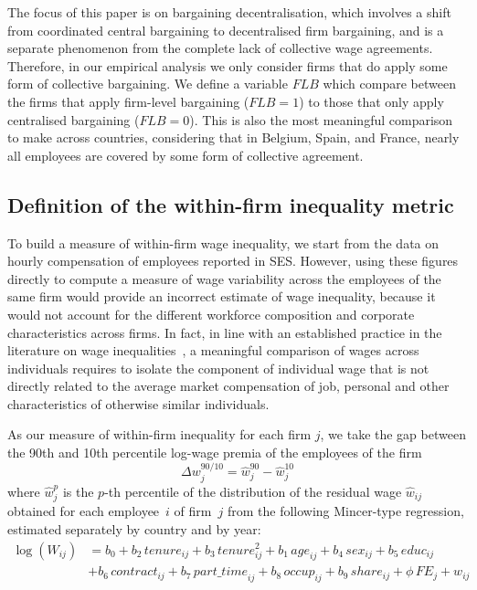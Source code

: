 \documentclass[12pt]{article}
\begin{document}
The focus of this paper is on bargaining decentralisation, which involves a shift from coordinated central bargaining to decentralised firm bargaining, and is a separate phenomenon from the complete lack of collective wage agreements. Therefore, in our empirical analysis we only consider firms that do apply some form of collective bargaining. We define a variable $\mathit{FLB}$ which compare between the firms that apply firm-level bargaining ($\mathit{FLB}=1$) to those that only apply centralised bargaining ($\mathit{FLB}=0$).
This is also the most meaningful comparison to make across countries, considering that in Belgium, Spain, and France, nearly all employees are covered by some form of collective agreement.


\subsection{Definition of the within-firm inequality metric}
To build a measure of within-firm wage inequality, we start from the data on hourly compensation of employees reported in SES. However, using these figures directly to compute a measure of wage variability across the employees of the same firm would provide an incorrect estimate of wage inequality, because it would not account for the different workforce composition and corporate characteristics across firms. In fact, in line with an established practice in the literature on wage inequalities~\citep[dating at least since][]{winter.ebmer.1999}, a meaningful comparison of wages across individuals requires to isolate the component of individual wage that is not directly related to the average market compensation of job, personal and other characteristics of otherwise similar individuals.

As our measure of within-firm inequality for each firm $j$, we take the gap between the 90th and 10th percentile log-wage premia of the employees of the firm
\begin{equation}
  \label{eq:def_disp_90_10}
  \Delta w^{90/10}_j=\hat{w}^{90}_j - \hat{w}^{10}_j
\end{equation}
\noindent where $\hat{w}^p_j$ is the $p$-th percentile of the distribution of the residual wage $\hat{w}_{ij}$ obtained for each employee~$i$ of firm~$j$ from the following Mincer-type regression, estimated separately by country and by year:
\begin{equation}
\label{eq:mincer}
\begin{split}
\log \left(W_{ij} \right)
&= b_0 + b_2\,\mathit{tenure}_{ij} + b_3\,\mathit{tenure}_{ij}^2 + b_1\,\mathit{age}_{ij} + b_4\,\mathit{sex}_{ij} + b_5\,\mathit{educ}_{ij} \\
&+ b_6\,\mathit{contract}_{ij} + b_7\,\mathit{part\_time}_{ij} + b_8\,\mathit{occup}_{ij} + b_9\,\mathit{share}_{ij} + \phi \,\mathit{FE}_j + w_{ij}
\end{split}
\end{equation}
\end{document}

